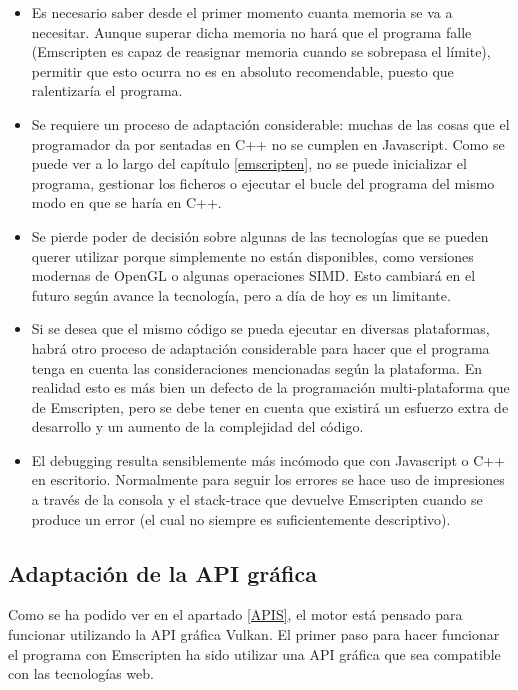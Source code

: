 \begin{itemize}
    \item Es necesario saber desde el primer momento cuanta memoria se va a necesitar. Aunque superar dicha memoria no hará que el programa falle (Emscripten es capaz de reasignar memoria cuando se sobrepasa el límite), permitir que esto ocurra no es en absoluto recomendable, puesto que ralentizaría el programa.
    
    \item Se requiere un proceso de adaptación considerable: muchas de las cosas que el programador da por sentadas en C++ no se cumplen en Javascript. Como se puede ver a lo largo del capítulo \ref{emscripten}, no se puede inicializar el programa, gestionar los ficheros o ejecutar el bucle del programa del mismo modo en que se haría en C++.
    
    \item Se pierde poder de decisión sobre algunas de las tecnologías que se pueden querer utilizar porque simplemente no están disponibles, como versiones modernas de OpenGL o algunas operaciones SIMD. Esto cambiará en el futuro según avance la tecnología, pero a día de hoy es un limitante.
    
    \item Si se desea que el mismo código se pueda ejecutar en diversas plataformas, habrá otro proceso de adaptación considerable para hacer que el programa tenga en cuenta las consideraciones mencionadas según la plataforma. En realidad esto es más bien un defecto de la programación multi-plataforma que de Emscripten, pero se debe tener en cuenta que existirá un esfuerzo extra de desarrollo y un aumento de la complejidad del código.
    
    \item El debugging resulta sensiblemente más incómodo que con Javascript o C++ en escritorio. Normalmente para seguir los errores se hace uso de impresiones a través de la consola y el stack-trace que devuelve Emscripten cuando se produce un error (el cual no siempre es suficientemente descriptivo).
\end{itemize}

\subsection{Adaptación de la API gráfica}
\label{emscripten_gapi}
Como se ha podido ver en el apartado \ref{APIS}, el motor está pensado para funcionar utilizando la API gráfica Vulkan. El primer paso para hacer funcionar el programa con Emscripten ha sido utilizar una API gráfica que sea compatible con las tecnologías web.


